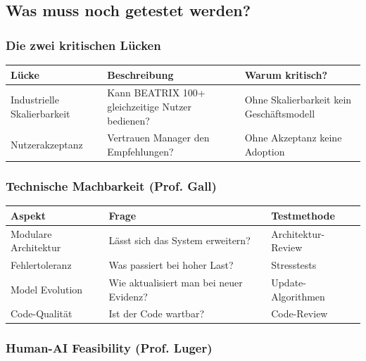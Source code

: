 \documentclass[11pt,a4paper]{article}
\begin{document}
\subsection{Was muss noch getestet werden?}

\subsubsection{Die zwei kritischen Lücken}

\begin{table}[h]
\centering
\begin{tabularx}{\textwidth}{lXX}
\toprule
\textbf{Lücke} & \textbf{Beschreibung} & \textbf{Warum kritisch?} \\
\midrule
Industrielle Skalierbarkeit & Kann BEATRIX 100+ gleichzeitige Nutzer bedienen? & Ohne Skalierbarkeit kein Geschäftsmodell \\
Nutzerakzeptanz & Vertrauen Manager den Empfehlungen? & Ohne Akzeptanz keine Adoption \\
\bottomrule
\end{tabularx}
\end{table}

\subsubsection{Technische Machbarkeit (Prof. Gall)}

\begin{table}[h]
\centering
\begin{tabularx}{\textwidth}{lXX}
\toprule
\textbf{Aspekt} & \textbf{Frage} & \textbf{Testmethode} \\
\midrule
Modulare Architektur & Lässt sich das System erweitern? & Architektur-Review \\
Fehlertoleranz & Was passiert bei hoher Last? & Stresstests \\
Model Evolution & Wie aktualisiert man bei neuer Evidenz? & Update-Algorithmen \\
Code-Qualität & Ist der Code wartbar? & Code-Review \\
\bottomrule
\end{tabularx}
\end{table}

\subsubsection{Human-AI Feasibility (Prof. Luger)}
\end{document}
